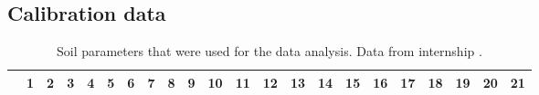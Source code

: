 \documentclass[10pt,twoside,dutch,english]{report}
\begin{document}
\begin{appendices}
	


\chapter{Calibration data}
	\label{chap: Calibration data}
	
		\begin{table}[ht] %
			\caption{Soil parameters that were used for the data analysis. Data from internship \cite{Echeverri2014}.}
			\tiny 
			\renewcommand{\arraystretch}{1.2}
			
			\begin{tabu} to \textwidth{X[2,l]X[l]X[l]X[l]X[l]X[l]X[l]X[l]X[l]X[l]X[l]X[l]X[l]X[l]X[l]X[l]X[l]X[l]X[l]X[l]X[l]X[l]}
				\toprule \rowfont{\bfseries}
 & 1 & 2 & 3 & 4 & 5 & 6 & 7 & 8 & 9 & 10 & 11 & 12 & 13 & 14 & 15 & 16 & 17 & 18 & 19 & 20 & 21 \\ \midrule


\end{tabu}
\end{table}
\end{appendices}
\end{document}
